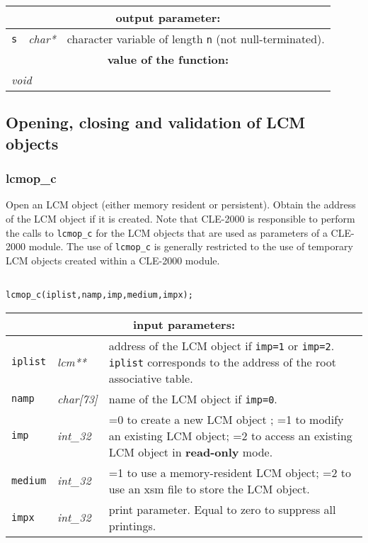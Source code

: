 \vskip 0.8cm

\noindent
\begin{tabular}{|p{1.5cm}|p{2cm}|p{11cm}|}
\hline
\multicolumn{3}{|c|}{\bf output parameter:} \\
\hline
{\tt s} & {\it char*} & character variable of length {\tt n} (not null-terminated). \\
\hline
\multicolumn{3}{|c|}{\bf value of the function:} \\
\hline
\multicolumn{2}{|l|}{\it void} &  \\
\hline
\end{tabular}

\vskip 0.8cm

\subsection{Opening, closing and validation of LCM objects}

\subsubsection{lcmop\_c}

Open an LCM object (either memory resident or persistent). Obtain the address of the LCM
object if it is created. Note that CLE-2000 is responsible to perform the calls to
{\tt lcmop\_c} for the LCM objects that are used as parameters of a CLE-2000 module. The use
of {\tt lcmop\_c} is generally restricted to the use of temporary LCM objects created within a CLE-2000 module.

\begin{verbatim}

lcmop_c(iplist,namp,imp,medium,impx);
\end{verbatim}

\noindent
\begin{tabular}{|p{1.5cm}|p{2cm}|p{11cm}|}
\hline
\multicolumn{3}{|c|}{\bf input parameters:} \\
\hline
{\tt iplist} & {\it lcm**} & address of the LCM object if {\tt imp=1} or {\tt imp=2}. {\tt iplist} corresponds to the address of the root associative table. \\
\hline
{\tt namp} & {\it char[73]} & name of the LCM object if {\tt imp=0}. \\
\hline
{\tt imp} & {\it int\_32} & =0 to create a new LCM object ; 
                                  =1 to modify an existing LCM object; 
				  =2 to access an existing LCM object in {\bf read-only} mode. \\
\hline
{\tt medium} & {\it int\_32} & =1 to use a memory-resident LCM object; 
                                     =2 to use an {\sc xsm} file to store the LCM object. \\
\hline
{\tt impx} & {\it int\_32} & print parameter. Equal to zero to suppress all printings. \\
\hline
\end{tabular}

